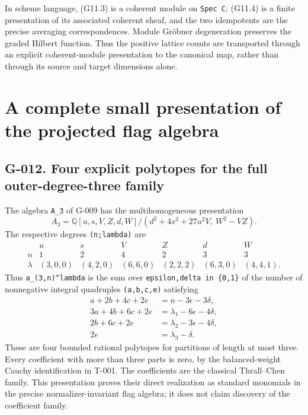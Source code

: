 \documentclass[
  10pt,
]{article}
\begin{document}
In scheme language, (G11.3) is a coherent module on
\texttt{\small Spec C}; (G11.4) is a finite presentation of its
associated coherent sheaf, and the two idempotents are the precise
averaging correspondences. Module Gröbner degeneration preserves the
graded Hilbert function. Thus the positive lattice counts are
transported through an explicit coherent-module presentation to the
canonical map, rather than through its source and target dimensions
alone.

\section{A complete small presentation of the projected flag
algebra}\label{a-complete-small-presentation-of-the-projected-flag-algebra}

\subsection{G-012. Four explicit polytopes for the full
outer-degree-three
family}\label{g-012.-four-explicit-polytopes-for-the-full-outer-degree-three-family}

The algebra \texttt{\small A\_\allowbreak{}3} of G-009 has the
multihomogeneous presentation \[
\boxed{A_3=\mathbb Q[u,s,V,Z,d,W]/(d^2+4s^3+27u^2V,\ W^2-VZ).}
\tag{G12.1}
\] The respective degrees
\texttt{\small (\allowbreak{}n;\allowbreak{}lambda)\allowbreak{}} are \[
\begin{array}{c|rrrrrr}
&u&s&V&Z&d&W\\\hline
n&1&2&4&2&3&3\\
\lambda&(3,0,0)&(4,2,0)&(6,6,0)&(2,2,2)&(6,3,0)&(4,4,1).
\end{array}
\tag{G12.2}
\] Thus
\texttt{\small a\_\allowbreak{}(\allowbreak{}3,\allowbreak{}n)\allowbreak{}\textasciicircum{}lambda}
is the sum over
\texttt{\small epsilon,\allowbreak{}delta in \{0,\allowbreak{}1\}} of
the number of nonnegative integral quadruples
\texttt{\small (\allowbreak{}a,\allowbreak{}b,\allowbreak{}c,\allowbreak{}e)\allowbreak{}}
satisfying \[
\begin{aligned}
a+2b+4c+2e&=n-3\epsilon-3\delta,\\
3a+4b+6c+2e&=\lambda_1-6\epsilon-4\delta,\\
2b+6c+2e&=\lambda_2-3\epsilon-4\delta,\\
2e&=\lambda_3-\delta.
\end{aligned}
\tag{G12.3}
\] These are four bounded rational polytopes for partitions of length at
most three. Every coefficient with more than three parts is zero, by the
balanced-weight Cauchy identification in T-001. The coefficients are the
classical Thrall--Chen family. This presentation proves their direct
realization as standard monomials in the precise normalizer-invariant
flag algebra; it does not claim discovery of the coefficient family.
\end{document}
